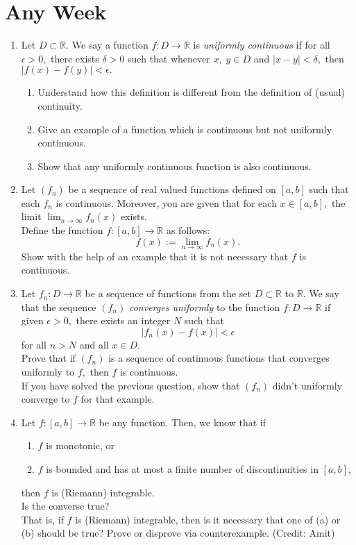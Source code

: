 \documentclass{article}
\begin{document}
\section{Any Week}
\begin{enumerate} 
	\item Let $D \subset \mathbb{R}.$ We say a function $f : D \to \mathbb{R}$ is \emph{uniformly continuous} if for all $\epsilon > 0,$ there exists $\delta > 0$ such that whenever $x,\;y \in D$ and $|x - y| < \delta,$ then $|f(x) - f(y)| < \epsilon.$
	\begin{enumerate} 
		\item Understand how this definition is different from the definition of (usual) continuity.
		\item Give an example of a function which is continuous but not uniformly continuous.
		\item Show that any uniformly continuous function is also continuous.
	\end{enumerate}
	\item Let $(f_n)$ be a sequence of real valued functions defined on $[a, b]$ such that each $f_n$ is continuous. Moreover, you are given that for each $x \in [a, b],$ the limit $\displaystyle\lim_{n\to \infty}f_n(x)$ exists. \\
	Define the function $f : [a, b] \to \mathbb{R}$ as follows:
	\[f(x) := \lim_{n\to \infty}f_n(x).\]
	Show with the help of an example that it is not necessary that $f$ is continuous.
	\item Let $f_n : D \to \mathbb{R}$ be a sequence of functions from the set $D \subset \mathbb{R}$ to $\mathbb{R}.$ We say that the sequence $(f_n)$ \emph{converges uniformly} to the function $f:D \to \mathbb{R}$ if given $\epsilon > 0,$ there exists an integer $N$ such that
	\[|f_n(x) - f(x)| < \epsilon\]
	for all $n > N$ and all $x \in D.$\\
	Prove that if $(f_n)$ is a sequence of continuous functions that converges uniformly to $f,$ then $f$ is continuous.\\
	If you have solved the previous question, show that $(f_n)$ didn't uniformly converge to $f$ for that example.
	\item Let $f:[a, b] \to \mathbb{R}$ be any function. Then, we know that if
	\begin{enumerate} 
		\item $f$ is monotonic, or
		\item $f$ is bounded and has at most a finite number of discontinuities in $[a, b],$
	\end{enumerate}
	then $f$ is (Riemann) integrable.\\
	Is the converse true?\\
	That is, if $f$ is (Riemann) integrable, then is it necessary that one of (a) or (b) should be true? Prove or disprove via counterexample. \hfill (Credit: Amit)
\end{enumerate}
\end{document}
